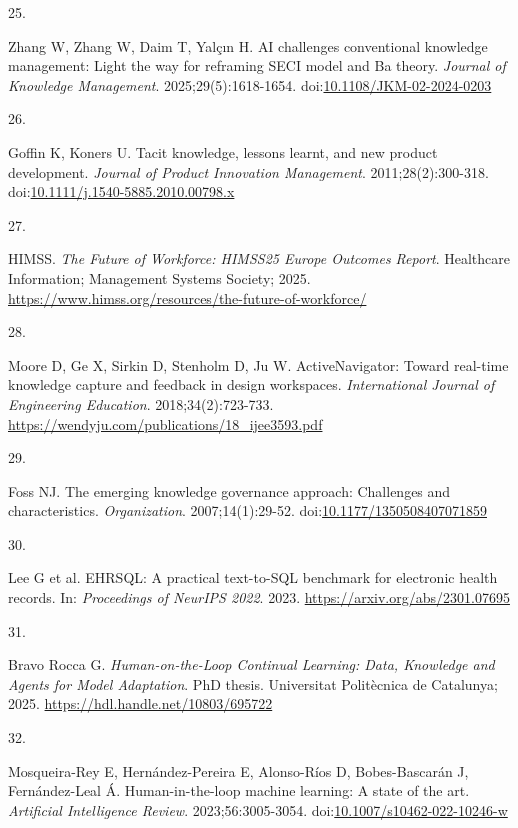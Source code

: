 \documentclass[
  american,
  11pt,
  letterpaper,
  oneside  ,captions=tableheading
]{scrartcl}
\newlength{\cslhangindent}
\newlength{\csllabelwidth}
\newenvironment{CSLReferences}[2] %
 {\begin{list}{}{%
  \setlength{\itemindent}{0pt}
  \setlength{\leftmargin}{0pt}
  \setlength{\parsep}{0pt}
  \ifodd #1
   \setlength{\leftmargin}{\cslhangindent}
   \setlength{\itemindent}{-1\cslhangindent}
  \fi
  \setlength{\itemsep}{#2\baselineskip}}}
 {\end{list}}
\newcommand{\CSLLeftMargin}[1]{\parbox[t]{\csllabelwidth}{\strut#1\strut}}
\newcommand{\CSLRightInline}[1]{\parbox[t]{\linewidth - \csllabelwidth}{\strut#1\strut}}
\begin{document}
\begin{CSLReferences}{0}{1}
\CSLLeftMargin{25. }%
\CSLRightInline{Zhang W, Zhang W, Daim T, Yalçın H. {{AI} challenges
conventional knowledge management: Light the way for reframing {SECI}
model and Ba theory}. \emph{Journal of Knowledge Management}.
2025;29(5):1618-1654.
doi:\href{https://doi.org/10.1108/JKM-02-2024-0203}{10.1108/JKM-02-2024-0203}}

\CSLLeftMargin{26. }%
\CSLRightInline{Goffin K, Koners U. {Tacit knowledge, lessons learnt,
and new product development}. \emph{Journal of Product Innovation
Management}. 2011;28(2):300-318.
doi:\href{https://doi.org/10.1111/j.1540-5885.2010.00798.x}{10.1111/j.1540-5885.2010.00798.x}}

\CSLLeftMargin{27. }%
\CSLRightInline{HIMSS. \emph{{The Future of Workforce: HIMSS25 Europe
Outcomes Report}}. Healthcare Information; Management Systems Society;
2025. \url{https://www.himss.org/resources/the-future-of-workforce/}}

\CSLLeftMargin{28. }%
\CSLRightInline{Moore D, Ge X, Sirkin D, Stenholm D, Ju W.
{ActiveNavigator: Toward real-time knowledge capture and feedback in
design workspaces}. \emph{International Journal of Engineering
Education}. 2018;34(2):723-733.
\url{https://wendyju.com/publications/18_ijee3593.pdf}}

\CSLLeftMargin{29. }%
\CSLRightInline{Foss NJ. {The emerging knowledge governance approach:
Challenges and characteristics}. \emph{Organization}. 2007;14(1):29-52.
doi:\href{https://doi.org/10.1177/1350508407071859}{10.1177/1350508407071859}}

\CSLLeftMargin{30. }%
\CSLRightInline{{Lee G et al.} {EHRSQL: A practical text-to-SQL
benchmark for electronic health records}. In: \emph{Proceedings of
NeurIPS 2022}. 2023. \url{https://arxiv.org/abs/2301.07695}}

\CSLLeftMargin{31. }%
\CSLRightInline{Bravo Rocca G. \emph{Human-on-the-Loop Continual
Learning: Data, Knowledge and Agents for Model Adaptation}. PhD thesis.
Universitat Polit{è}cnica de Catalunya; 2025.
\url{https://hdl.handle.net/10803/695722}}

\CSLLeftMargin{32. }%
\CSLRightInline{Mosqueira-Rey E, Hernández-Pereira E, Alonso-Ríos D,
Bobes-Bascarán J, Fernández-Leal Á. Human-in-the-loop machine learning:
A state of the art. \emph{Artificial Intelligence Review}.
2023;56:3005-3054.
doi:\href{https://doi.org/10.1007/s10462-022-10246-w}{10.1007/s10462-022-10246-w}}


\end{CSLReferences}
\end{document}
